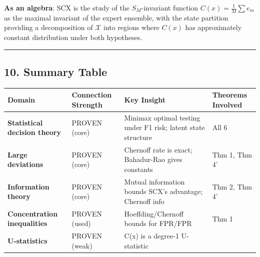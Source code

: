\documentclass[
  12pt,
]{article}
\begin{document}
\textbf{As an algebra}: SCX is the study of the \(S_M\)-invariant
function \(C(x) = \frac{1}{M}\sum e_m\) as the maximal invariant of the
expert ensemble, with the state partition providing a decomposition of
\(\mathcal{X}\) into regions where \(C(x)\) has approximately constant
distribution under both hypotheses.

\begin{center}\rule{0.5\linewidth}{0.5pt}\end{center}

\subsection{10. Summary Table}\label{summary-table}

\begin{longtable}[]{@{}
  >{\raggedright\arraybackslash}p{}
  >{\raggedright\arraybackslash}p{}
  >{\raggedright\arraybackslash}p{}
  >{\raggedright\arraybackslash}p{}@{}}
\toprule\noalign{}
\begin{minipage}[b]{\linewidth}\raggedright
Domain
\end{minipage} & \begin{minipage}[b]{\linewidth}\raggedright
Connection Strength
\end{minipage} & \begin{minipage}[b]{\linewidth}\raggedright
Key Insight
\end{minipage} & \begin{minipage}[b]{\linewidth}\raggedright
Theorems Involved
\end{minipage} \\
\midrule\noalign{}
\endhead
\bottomrule\noalign{}
\endlastfoot
\textbf{Statistical decision theory} & PROVEN (core) & Minimax optimal
testing under F1 risk; latent state structure & All 6 \\
\textbf{Large deviations} & PROVEN (core) & Chernoff rate is exact;
Bahadur-Rao gives constants & Thm 1, Thm 4' \\
\textbf{Information theory} & PROVEN (core) & Mutual information bounds
SCX's advantage; Chernoff info & Thm 2, Thm 4' \\
\textbf{Concentration inequalities} & PROVEN (used) & Hoeffding/Chernoff
bounds for FPR/FPR & Thm 1 \\
\textbf{U-statistics} & PROVEN (weak) & C(x) is a degree-1 U-statistic &

\end{longtable}
\end{document}
